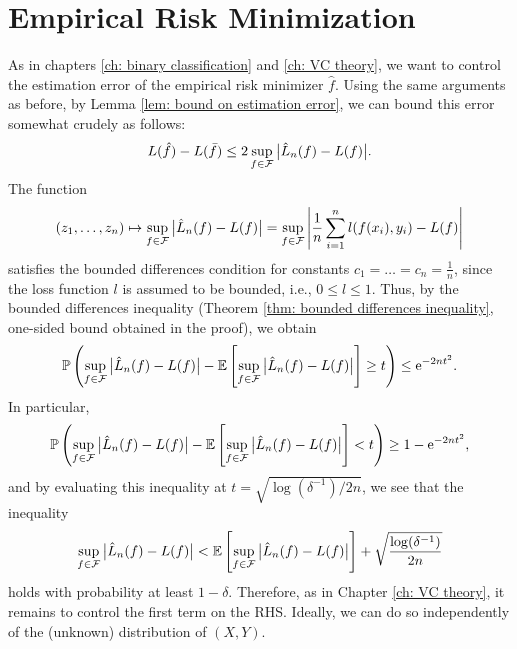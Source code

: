 \section{Empirical Risk Minimization}

As in chapters \ref{ch: binary classification} and \ref{ch: VC theory}, we want to control the estimation error of the empirical risk minimizer $\hat f$. Using the same arguments as before, by Lemma \ref{lem: bound on estimation error}, we can bound this error somewhat crudely as follows:
\[
    L(\hat f) - L(\bar f) \leq 2 \sup_{f \in \mathcal{F}} \big\lvert\hat L_n(f) - L(f)\big\rvert.
\]
The function
\[
    (z_1, \dots, z_n) \mapsto \sup_{f \in \mathcal{F}} \big\lvert\hat L_n(f) - L(f)\big\rvert = \sup_{f \in \mathcal{F}} \abs{ \frac{1}{n} \sum_{i=1}^n l(f(x_i), y_i) - L(f) }
\]
satisfies the bounded differences condition for constants $c_1 = \dots = c_n = \frac{1}{n}$, since the loss function $l$ is assumed to be bounded, i.e., $0 \leq l \leq 1$. Thus, by the bounded differences inequality (Theorem \ref{thm: bounded differences inequality}, one-sided bound obtained in the proof), we obtain
\[
    \mathbb{P}\left( \sup_{f \in \mathcal{F}} \big\lvert\hat L_n(f) - L(f)\big\rvert - \mathbb{E}\left[ \sup_{f \in \mathcal{F}} \big\lvert\hat L_n(f) - L(f)\big\rvert \right] \geq t \right) \leq \mathrm{e}^{-2nt^2}.
\]
In particular,
\[
    \mathbb{P}\left( \sup_{f \in \mathcal{F}} \big\lvert\hat L_n(f) - L(f)\big\rvert - \mathbb{E}\left[ \sup_{f \in \mathcal{F}} \big\lvert\hat L_n(f) - L(f)\big\rvert \right] < t \right) \geq 1 - \mathrm{e}^{-2nt^2},
\]
and by evaluating this inequality at $t = \sqrt{\log(\delta^{-1})/2n}$, we see that the inequality
\[
    \sup_{f \in \mathcal{F}} \big\lvert\hat L_n(f) - L(f)\big\rvert < \mathbb{E}\left[ \sup_{f \in \mathcal{F}} \big\lvert\hat L_n(f) - L(f)\big\rvert \right] + \sqrt{ \frac{\log(\delta^{-1})}{2n} }
\]
holds with probability at least $1 - \delta$. Therefore, as in Chapter \ref{ch: VC theory}, it remains to control the first term on the RHS. Ideally, we can do so independently of the (unknown) distribution of $(X, Y)$.
